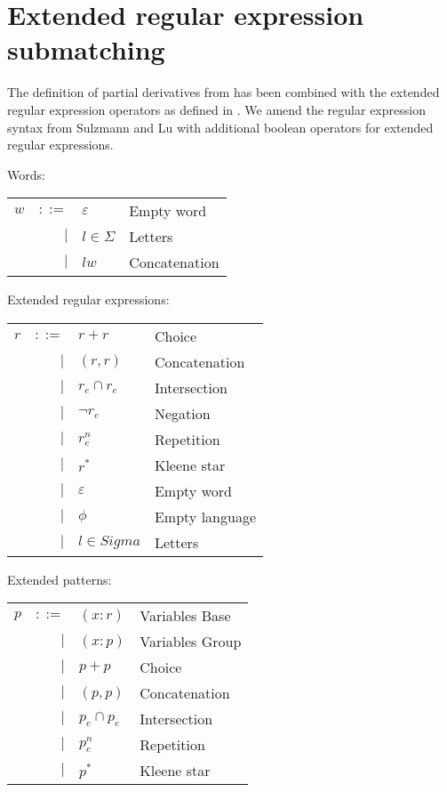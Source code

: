 \section{Extended regular expression submatching}
\label{ere-submatch}

The definition of partial derivatives from \cite{pd-pat} has been combined
with the extended regular expression operators as defined in \cite{pd-ere}. We
amend the regular expression syntax from Sulzmann and Lu with additional
boolean operators for extended regular expressions.

Words:

\begin{tabular}{lrll}
   $w$	& $::=$	& $\varepsilon$		& Empty word	\\
	& $|$	& $l \in \Sigma$	& Letters	\\
	& $|$	& $lw$			& Concatenation	\\
\end{tabular}

Extended regular expressions:

\begin{tabular}{lrll}
   $r$		& $::=$	& $r+r$				& Choice		\\
		& $|$	& $(r,r)$			& Concatenation		\\
		& $|$	& $r_e \cap r_e$		& Intersection		\\
        	& $|$	& $\neg r_e$			& Negation		\\
        	& $|$	& $r_e^n$			& Repetition		\\
		& $|$	& $r^*$				& Kleene star		\\
		& $|$	& $\varepsilon$			& Empty word		\\
		& $|$	& $\phi$			& Empty language	\\
		& $|$	& $l \in Sigma$			& Letters		\\
\end{tabular}

Extended patterns:

\begin{tabular}{lrll}
   $p$		& $::=$	& $(x:r)$			& Variables Base	\\
		& $|$	& $(x:p)$			& Variables Group	\\
		& $|$	& $p+p$				& Choice		\\
		& $|$	& $(p,p)$			& Concatenation		\\
		& $|$	& $p_e \cap p_e$		& Intersection		\\
        	& $|$	& $p_e^n$			& Repetition		\\
		& $|$	& $p^*$				& Kleene star		\\
\end{tabular}



